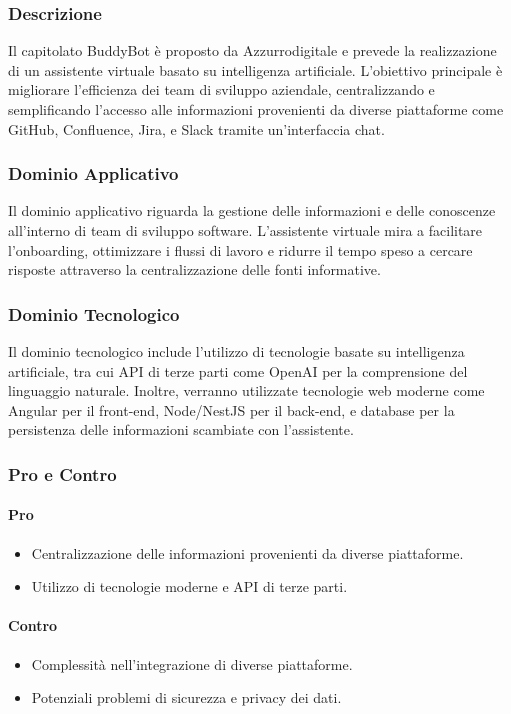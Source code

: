 \documentclass{article}
\begin{document}
\subsubsection{Descrizione}
Il capitolato BuddyBot è proposto da Azzurrodigitale e prevede la realizzazione 
di un assistente virtuale basato su intelligenza artificiale. 
L'obiettivo principale è migliorare l'efficienza dei team di sviluppo aziendale, 
centralizzando e semplificando l'accesso alle informazioni provenienti da diverse piattaforme come GitHub, 
Confluence, Jira, e Slack tramite un'interfaccia chat.

\subsubsection{Dominio Applicativo}
Il dominio applicativo riguarda la gestione delle informazioni e 
delle conoscenze all'interno di team di sviluppo software. 
L'assistente virtuale mira a facilitare l'onboarding, ottimizzare i flussi di lavoro e ridurre 
il tempo speso a cercare risposte attraverso la centralizzazione delle fonti informative.

\subsubsection{Dominio Tecnologico}
Il dominio tecnologico include l'utilizzo di tecnologie basate su intelligenza artificiale, 
tra cui API di terze parti come OpenAI per la comprensione del linguaggio naturale. 
Inoltre, verranno utilizzate tecnologie web moderne come Angular per il front-end, 
Node/NestJS per il back-end, e database per la persistenza delle informazioni scambiate con l'assistente.

\subsubsection{Pro e Contro}

\paragraph{Pro}
\begin{itemize}
    \item Centralizzazione delle informazioni provenienti da diverse piattaforme.
    \item Utilizzo di tecnologie moderne e API di terze parti.
\end{itemize}

\paragraph{Contro}
\begin{itemize}
    \item Complessità nell'integrazione di diverse piattaforme.
    \item Potenziali problemi di sicurezza e privacy dei dati.
\end{itemize}
\end{document}
